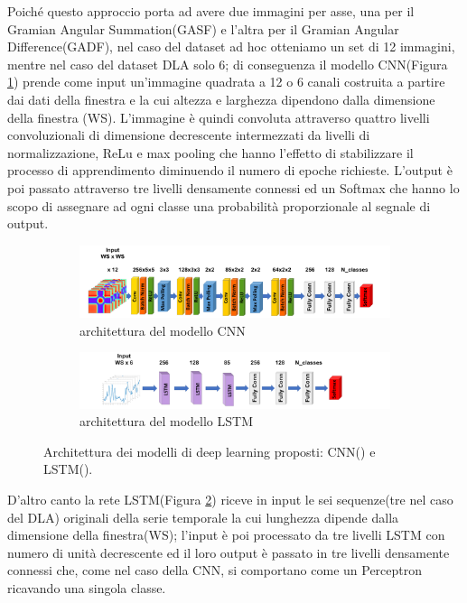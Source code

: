 Poiché questo approccio porta ad avere due immagini per asse, una per il Gramian Angular Summation(GASF) e l'altra per il Gramian Angular Difference(GADF), nel caso del dataset ad hoc otteniamo un set di 12 immagini, mentre nel caso del dataset DLA solo 6; di conseguenza il modello CNN(Figura \ref{fig:models:cnn}) prende come input un'immagine quadrata a 12 o 6 canali costruita a partire dai dati della finestra e la cui altezza e larghezza dipendono dalla dimensione della finestra (WS). L'immagine è quindi convoluta attraverso quattro livelli convoluzionali di dimensione decrescente intermezzati da livelli di normalizzazione, ReLu e max pooling che hanno l'effetto di stabilizzare il processo di apprendimento diminuendo il numero di epoche richieste. L'output è poi passato attraverso tre livelli densamente connessi ed un Softmax che hanno lo scopo di assegnare ad ogni classe una probabilità proporzionale al segnale di output.

\begin{figure}[!htb]
    \centering
    \begin{subfigure}{\textwidth}
        \includegraphics[width=\textwidth]{figure/cnn_model.png}
        \caption{architettura del modello CNN}
        \label{fig:models:cnn}
    \end{subfigure}
    \begin{subfigure}{\textwidth}
        \includegraphics[width=\textwidth]{figure/lstm_model.png}
        \caption{architettura del modello LSTM}
        \label{fig:models:lstm}
    \end{subfigure}
    \caption{Architettura dei modelli di deep learning proposti: CNN() e LSTM().}
    \label{fig:models}
\end{figure}

D'altro canto la rete LSTM(Figura \ref{fig:models:lstm}) riceve in input le sei sequenze(tre nel caso del DLA) originali della serie temporale la cui lunghezza dipende dalla dimensione della finestra(WS); l'input è poi processato da tre livelli LSTM con numero di unità decrescente ed il loro output è passato in tre livelli densamente connessi che, come nel caso della CNN, si comportano come un Perceptron ricavando una singola classe.

